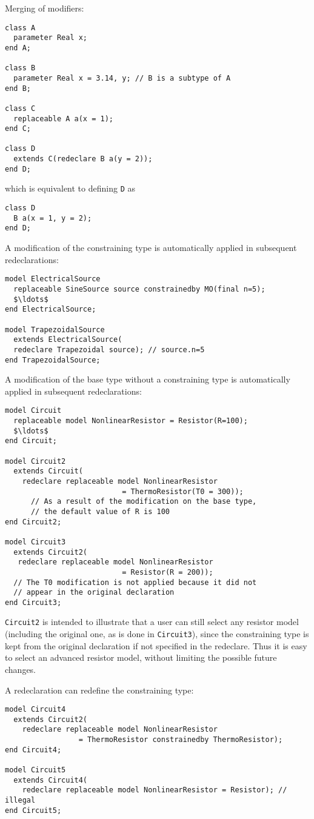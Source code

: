 \begin{example}
Merging of modifiers:
\begin{lstlisting}[language=modelica]
class A
  parameter Real x;
end A;

class B
  parameter Real x = 3.14, y; // B is a subtype of A
end B;

class C
  replaceable A a(x = 1);
end C;

class D
  extends C(redeclare B a(y = 2));
end D;
\end{lstlisting}
which is equivalent to defining \lstinline!D! as
\begin{lstlisting}[language=modelica]
class D
  B a(x = 1, y = 2);
end D;
\end{lstlisting}

A modification of the constraining type is automatically applied
in subsequent redeclarations:
\begin{lstlisting}[language=modelica]
model ElectricalSource
  replaceable SineSource source constrainedby MO(final n=5);
  $\ldots$
end ElectricalSource;

model TrapezoidalSource
  extends ElectricalSource(
  redeclare Trapezoidal source); // source.n=5
end TrapezoidalSource;
\end{lstlisting}

A modification of the base type without a constraining type is
automatically applied in subsequent redeclarations:
\begin{lstlisting}[language=modelica]
model Circuit
  replaceable model NonlinearResistor = Resistor(R=100);
  $\ldots$
end Circuit;

model Circuit2
  extends Circuit(
    redeclare replaceable model NonlinearResistor
                           = ThermoResistor(T0 = 300));
      // As a result of the modification on the base type,
      // the default value of R is 100
end Circuit2;

model Circuit3
  extends Circuit2(
   redeclare replaceable model NonlinearResistor
                           = Resistor(R = 200));
  // The T0 modification is not applied because it did not
  // appear in the original declaration
end Circuit3;
\end{lstlisting}

\lstinline!Circuit2! is intended to illustrate that a user can still select
any resistor model (including the original one, as is done in \lstinline!Circuit3!),
since the constraining type is kept from the original declaration if not
specified in the redeclare. Thus it is easy to select an advanced
resistor model, without limiting the possible future changes.

A redeclaration can redefine the constraining type:
\begin{lstlisting}[language=modelica]
model Circuit4
  extends Circuit2(
    redeclare replaceable model NonlinearResistor
                 = ThermoResistor constrainedby ThermoResistor);
end Circuit4;

model Circuit5
  extends Circuit4(
    redeclare replaceable model NonlinearResistor = Resistor); // illegal
end Circuit5;
\end{lstlisting}
\end{example}

